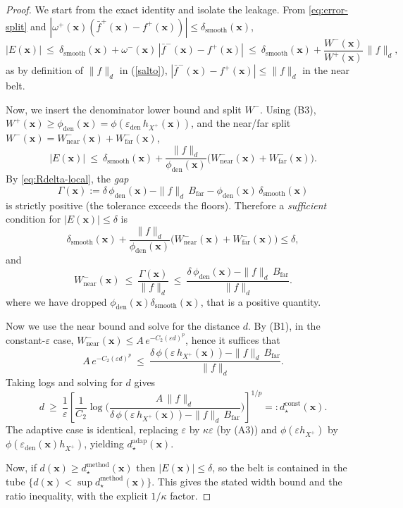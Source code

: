 \documentclass[10pt,a4paper]{amsart}
\begin{document}
\begin{proof}
We start from the exact identity and isolate the leakage.
From \eqref{eq:error-split} and $|\omega^{+}(\mathbf{x})(\bar f^{+}(\mathbf{x})-f^{+}(\mathbf{x}))|\le \delta_{\mathrm{smooth}}(\mathbf{x})$,
\[
|E(\mathbf{x})|\ \le\ \delta_{\mathrm{smooth}}(\mathbf{x})
+ \omega^{-}(\mathbf{x})\,|\bar f^{-}(\mathbf{x})-f^{+}(\mathbf{x})|
\ \le\ \delta_{\mathrm{smooth}}(\mathbf{x})
+ \frac{W^{-}(\mathbf{x})}{W^{+}(\mathbf{x})}\,\|f\|_{d},
\]
as by definition of $\|f\|_{d}$ in (\ref{salto}),
$|\bar f^{-}(\mathbf{x})-f^{+}(\mathbf{x})|\le \|f\|_{d}$ in the near belt.

\smallskip
Now, we insert the denominator lower bound and split $W^{-}$.
Using (B3), $W^{+}(\mathbf{x})\ge \phi_{\mathrm{den}}(\mathbf{x})
=\phi(\varepsilon_{\mathrm{den}}\,h_{X^{+}}(\mathbf{x}))$,
and the near/far split $W^{-}(\mathbf{x})=W^{-}_{\mathrm{near}}(\mathbf{x})+W^{-}_{\mathrm{far}}(\mathbf{x})$,
\[
|E(\mathbf{x})|\ \le\ \delta_{\mathrm{smooth}}(\mathbf{x})
+ \frac{\|f\|_{d}}{\phi_{\mathrm{den}}(\mathbf{x})}
\Big(W^{-}_{\mathrm{near}}(\mathbf{x})+W^{-}_{\mathrm{far}}(\mathbf{x})\Big).
\]
\smallskip
By \eqref{eq:Rdelta-local}, the \emph{gap}
\[
\Gamma(\mathbf{x})
:=\delta\,\phi_{\mathrm{den}}(\mathbf{x})
-\|f\|_{d}\,B_{\mathrm{far}}
-\phi_{\mathrm{den}}(\mathbf{x})\,\delta_{\mathrm{smooth}}(\mathbf{x})
\]
is strictly positive (the tolerance exceeds the floors). Therefore a \emph{sufficient} condition for
$|E(\mathbf{x})|\le \delta$ is
\[
  \delta_{\mathrm{smooth}}(\mathbf{x})
+ \frac{\|f\|_{d}}{\phi_{\mathrm{den}}(\mathbf{x})}
\Big(W^{-}_{\mathrm{near}}(\mathbf{x})+W^{-}_{\mathrm{far}}(\mathbf{x})\Big)\le\delta,
\]
and
\[
W^{-}_{\mathrm{near}}(\mathbf{x})\ \le\ \frac{\Gamma(\mathbf{x})}{\|f\|_{d}}
\ \le\ \frac{\delta\,\phi_{\mathrm{den}}(\mathbf{x})-\|f\|_{d}\,B_{\mathrm{far}}}{\|f\|_{d}}.
\]
where we have dropped $\phi_{\mathrm{den}}(\mathbf{x})\delta_{\mathrm{smooth}}(\mathbf{x})$, that is a positive quantity.

\smallskip
Now we use the near bound and solve for the distance $d$. By (B1), in the constant-$\varepsilon$ case,
$W^{-}_{\mathrm{near}}(\mathbf{x})\le A\,e^{-C_2(\varepsilon d)^p}$, hence it suffices that
\[
A\,e^{-C_2(\varepsilon d)^p}
\ \le\
\frac{\delta\,\phi(\varepsilon\,h_{X^{+}}(\mathbf{x}))-\|f\|_{d}\,B_{\mathrm{far}}}{\|f\|_{d}}.
\]
Taking logs and solving for $d$ gives
\[
d\ \ge\
\frac{1}{\varepsilon}\left[
\frac{1}{C_2}\log\!\Big(
\frac{A\,\|f\|_{d}}{
\delta\,\phi(\varepsilon\,h_{X^{+}}(\mathbf{x}))-\|f\|_{d}\,B_{\mathrm{far}}}
\Big)\right]^{\!1/p}
=:d_{\star}^{\mathrm{const}}(\mathbf{x}).
\]
The adaptive case is identical, replacing $\varepsilon$ by $\kappa\varepsilon$ (by (A3)) and
$\phi(\varepsilon h_{X^{+}})$ by $\phi(\varepsilon_{\mathrm{den}}(\mathbf{x}) h_{X^{+}})$, yielding
$d_{\star}^{\mathrm{adap}}(\mathbf{x})$.

\smallskip

Now, if $d(\mathbf{x})\ge d_{\star}^{\mathrm{method}}(\mathbf{x})$ then $|E(\mathbf{x})|\le \delta$, so the belt
is contained in the tube $\{d(\mathbf{x})<\sup d_{\star}^{\mathrm{method}}(\mathbf{x})\}$. This gives the
stated width bound and the ratio inequality, with the explicit $1/\kappa$ factor.
\end{proof}
\end{document}
